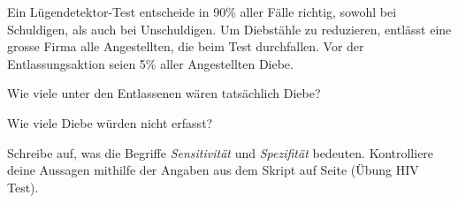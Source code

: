 \documentclass[%
11pt,%
twoside,%
titlepage,%
german,%
headsepline%
]{scrartcl}
\begin{document}
\begin{ueb}[Lügendetektortest]
Ein Lügendetektor-Test entscheide in 90\% aller Fälle richtig, sowohl bei Schuldigen, als auch bei Unschuldigen. Um Diebstähle zu reduzieren, entlässt eine grosse Firma alle Angestellten, die beim Test durchfallen. Vor der Entlassungsaktion seien 5\% aller Angestellten Diebe.
\begin{enumeratea}
\item Wie viele unter den Entlassenen wären tatsächlich Diebe?
\item Wie viele Diebe würden nicht erfasst?
\end{enumeratea}
\end{ueb}


\begin{ueb}
Schreibe auf, was die Begriffe \emph{Sensitivität} und \emph{Spezifität} bedeuten. Kontrolliere deine Aussagen mithilfe der Angaben aus dem Skript auf Seite \pageref{ueb:hiv} (\"Ubung HIV Test).
\end{ueb}
\end{document}
